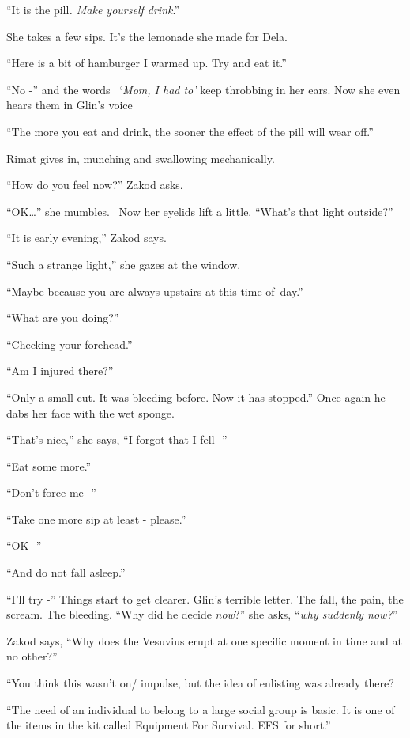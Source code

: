 \documentclass[letterpaper]{article}
\begin{document}
{}``It is the pill\textit{. Make yourself drink}.'' 

She takes a few sips. It's the lemonade she made for Dela.

{}``Here is a bit of hamburger I warmed up. Try and eat it.''

{}``No -'' and the words \ {}`\textit{Mom, I had to'} keep throbbing in her ears. Now she even hears them in Glin's
voice

{}``The more you eat and drink, the sooner the effect of the pill will wear off.''

Rimat gives in, munching and swallowing mechanically.

{}``How do you feel now?'' Zakod asks. 

{}``OK{\dots}'' she mumbles.~ Now her eyelids lift a little. ``What's that light outside?'' 

{}``It is early evening,'' Zakod says. 

{}``Such a strange light,'' she gazes at the window. 

{}``Maybe because you are always upstairs at this time of~day.'' 

{}``What are you doing?'' 

{}``Checking your forehead.'' 

{}``Am I injured there?'' 

{}``Only a small cut. It was bleeding before. Now it has stopped.'' Once again he dabs her face with the wet sponge. 

{}``That's nice,'' she says, ``I forgot that I fell -'' 

{}``Eat some more.''

{}``Don't force me -'' 

{}``Take one more sip at least - please.'' 

{}``OK -'' 

{}``And do not fall asleep.''

{}``I'll try -'' Things start to get clearer. Glin's terrible letter. The fall, the pain, the scream. The bleeding.
``Why did he decide \textit{now}?'' she asks, ``\textit{why suddenly now?}{}''

Zakod says, ``Why does the Vesuvius erupt at one specific moment in time and at no other?'' 

{}``You think this wasn't on/ impulse, but the idea of enlisting was already there?{\textquotedbl} 

{}``The need of an individual to belong to a large social group is basic. It is one of the items in the kit called
Equipment For Survival. EFS for short.'' 
\end{document}
